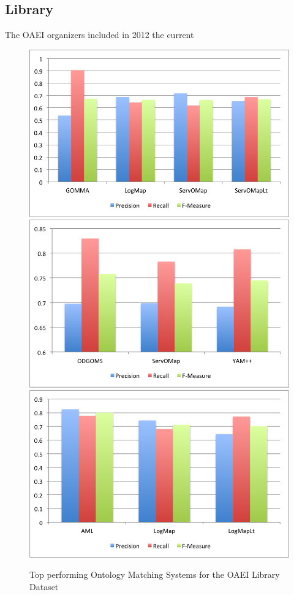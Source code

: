 \documentclass[11pt,titlepage,oneside,openany,a4paper]{report}
\begin{document}
\subsection{Library}
The OAEI organizers included in 2012 the current 
\begin{figure}
 \includegraphics[scale=.5]{figures/oaei/library/top2012.png}
 \includegraphics[scale=.5]{figures/oaei/library/top2013.png}  
 \includegraphics[scale=.5]{figures/oaei/library/top2014.png} 
 \caption{Top performing Ontology Matching Systems for  the OAEI Library Dataset}
 \label{img::oaei_anatomy}
\end{figure}
\end{document}
